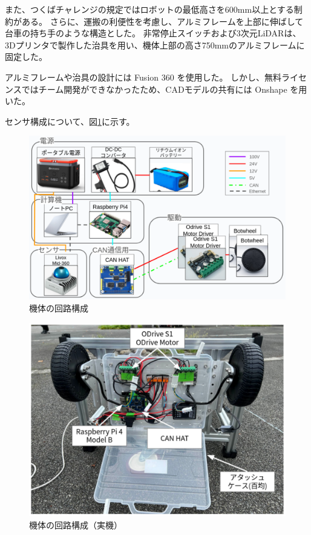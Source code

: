 \documentclass[twocolumn,9pt]{jsproceedings}
\begin{document}
また、つくばチャレンジの規定ではロボットの最低高さを600mm以上とする制約がある。
さらに、運搬の利便性を考慮し、アルミフレームを上部に伸ばして台車の持ち手のような構造とした。
非常停止スイッチおよび3次元LiDARは、3Dプリンタで製作した治具を用い、機体上部の高さ750mmのアルミフレームに固定した。

アルミフレームや治具の設計には Fusion 360 \cite{Fusion360} を使用した。
しかし、無料ライセンスではチーム開発ができなかったため、CADモデルの共有には Onshape \cite{Onshape} を用いた。


センサ構成について、図\ref{fig:botwheel-explorer-schematic}に示す。
\begin{figure}[h]
  \begin{center}
    \includegraphics[width=1.0\linewidth]{figs/botwheel-explorer-schematic.pdf}
    \caption{機体の回路構成}
    \label{fig:botwheel-explorer-schematic}
  \end{center}
\end{figure}

\begin{figure}[h]
  \begin{center}
    \includegraphics[width=1.0\linewidth]{figs/trainee_under.pdf}
    \caption{機体の回路構成（実機）}
    \label{fig:trainee_under}
  \end{center}
\end{figure}
\end{document}
